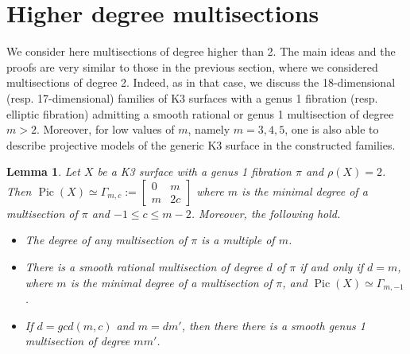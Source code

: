 \documentclass{amsart}
\newtheorem{lemma}[theorem]{Lemma}
\theoremstyle{definition}
\numberwithin{equation}{section}
\DeclareMathOperator{\Pic}{Pic}
\begin{document}
\section{Higher degree multisections}\label{section: higher degree}
We consider here multisections of degree higher than 2. The main ideas and the proofs are very similar to those in the previous section, where we considered multisections of degree 2. Indeed, as in that case, we discuss the 18-dimensional (resp. 17-dimensional) families of K3 surfaces with a genus 1 fibration (resp. elliptic fibration) admitting a smooth rational or genus 1 multisection of degree $m>2$. Moreover, for low values of $m$, namely $m=3,4,5$, one is also able to describe projective models of the generic K3 surface in the constructed families. %
\begin{lemma}
Let $X$ be a K3 surface with a genus 1 fibration $\pi$ and $\rho(X)=2$. Then $\Pic(X)\simeq \Gamma_{m,c}:=\left[\begin{array}{cc}0&m\\m&2c\end{array}\right]$ where $m$ is the minimal degree of a multisection of $\pi$ and $-1\leq c\leq m-2$. Moreover, the following hold.
\begin{itemize}
\item[i)] The degree of any multisection of $\pi$ is a multiple of $m$. 
\item[ii)] There is a smooth rational multisection of degree $d$ of $\pi$ if and only if $d=m$, where $m$ is the minimal degree of a multisection of $\pi$, and $\Pic(X)\simeq \Gamma_{m,-1}$.
\item[iii)]If $d=gcd(m,c)$ and $m=dm'$, then there there is a smooth genus 1 multisection of degree $mm'$.
\end{itemize}
\end{lemma}
\end{document}

